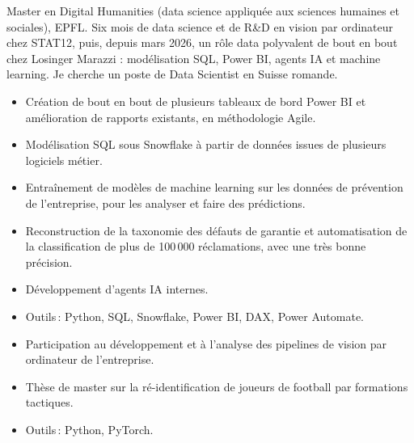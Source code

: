 
\renewcommand{\cvcolon}{\,:}



Master en Digital Humanities (data science appliqu\'ee aux sciences humaines et sociales), EPFL. Six mois de data
science et de R\&D en vision par ordinateur chez STAT12, puis, depuis mars 2026, un r\^ole data polyvalent de bout
en bout chez Losinger Marazzi : mod\'elisation SQL, Power BI, agents IA et machine learning. Je cherche un poste
de Data Scientist en Suisse romande.

\begin{itemize}
  \item Cr\'eation de bout en bout de plusieurs tableaux de bord Power BI et am\'elioration de rapports existants, en m\'ethodologie Agile.
  \item Mod\'elisation SQL sous Snowflake \`a partir de donn\'ees issues de plusieurs logiciels m\'etier.
  \item Entra\^inement de mod\`eles de machine learning sur les donn\'ees de pr\'evention de l'entreprise, pour les analyser et faire des pr\'edictions.
  \item Reconstruction de la taxonomie des d\'efauts de garantie et automatisation de la classification de plus de 100\,000 r\'eclamations, avec une tr\`es bonne pr\'ecision.
  \item D\'eveloppement d'agents IA internes.
  \item Outils\,: Python, SQL, Snowflake, Power BI, DAX, Power Automate.
\end{itemize}

\begin{itemize}
  \item Participation au d\'eveloppement et \`a l'analyse des pipelines de vision par ordinateur de l'entreprise.
  \item Th\`ese de master sur la r\'e-identification de joueurs de football par formations tactiques.
  \item Outils\,: Python, PyTorch.
\end{itemize}

